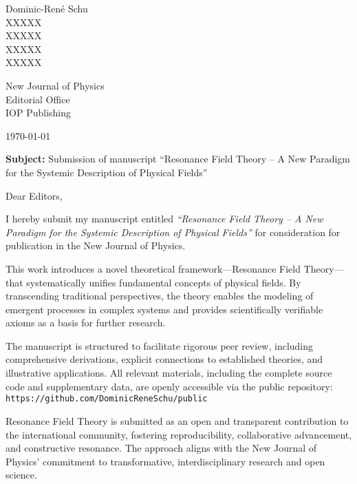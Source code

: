 \documentclass[a4paper,12pt]{article}
\begin{document}
	
	\vspace*{-2cm}
	
	Dominic-René Schu\\
	XXXXX\\
	XXXXX\\
	XXXXX\\
	XXXXX\\
	
	\vspace{1cm}
	
	New Journal of Physics\\
	Editorial Office\\
	IOP Publishing
	
	\vspace{1cm}
	
	\today
	
	\vspace{1cm}
	
	\textbf{Subject:} Submission of manuscript ``Resonance Field Theory – A New Paradigm for the Systemic Description of Physical Fields''
	
	\vspace{1cm}
	
	Dear Editors,
	
	\vspace{0.5cm}
	
	I hereby submit my manuscript entitled \textit{``Resonance Field Theory – A New Paradigm for the Systemic Description of Physical Fields''} for consideration for publication in the New Journal of Physics.
	
	This work introduces a novel theoretical framework—Resonance Field Theory—that systematically unifies fundamental concepts of physical fields. By transcending traditional perspectives, the theory enables the modeling of emergent processes in complex systems and provides scientifically verifiable axioms as a basis for further research.
	
	The manuscript is structured to facilitate rigorous peer review, including comprehensive derivations, explicit connections to established theories, and illustrative applications. All relevant materials, including the complete source code and supplementary data, are openly accessible via the public repository: \\
	\texttt{https://github.com/DominicReneSchu/public}
	
	Resonance Field Theory is submitted as an open and transparent contribution to the international community, fostering reproducibility, collaborative advancement, and constructive resonance. The approach aligns with the New Journal of Physics’ commitment to transformative, interdisciplinary research and open science.
	
\end{document}
